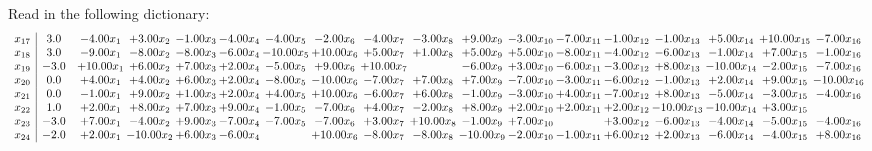\documentclass[9pt]{article}
\begin{document}
Read in the following dictionary:
\[\begin{array}{c| c c@{\hskip 2pt} c@{\hskip 2pt} c@{\hskip 2pt} c@{\hskip 2pt} c@{\hskip 2pt} c@{\hskip 2pt} c@{\hskip 2pt} c@{\hskip 2pt} c@{\hskip 2pt} c@{\hskip 2pt} c@{\hskip 2pt} c@{\hskip 2pt} c@{\hskip 2pt} c@{\hskip 2pt} c@{\hskip 2pt} c@{\hskip 2pt} }
 x_{17}   &  3.0 & -4.00 x_{1} & +  3.00 x_{2} & -1.00 x_{3} & -4.00 x_{4} & -4.00 x_{5} & -2.00 x_{6} & -4.00 x_{7} & -3.00 x_{8} & +  9.00 x_{9} & -3.00 x_{10} & -7.00 x_{11} & -1.00 x_{12} & -1.00 x_{13} & +  5.00 x_{14} & + 10.00 x_{15} & -7.00 x_{16}\\
 x_{18}   &  3.0 & -9.00 x_{1} & -8.00 x_{2} & -8.00 x_{3} & -6.00 x_{4} & -10.00 x_{5} & + 10.00 x_{6} & +  5.00 x_{7} & +  1.00 x_{8} & +  5.00 x_{9} & +  5.00 x_{10} & -8.00 x_{11} & -4.00 x_{12} & -6.00 x_{13} & -1.00 x_{14} & +  7.00 x_{15} & -1.00 x_{16}\\
 x_{19}   &  -3.0 & + 10.00 x_{1} & +  6.00 x_{2} & +  7.00 x_{3} & +  2.00 x_{4} & -5.00 x_{5} & +  9.00 x_{6} & + 10.00 x_{7} &   & -6.00 x_{9} & +  3.00 x_{10} & -6.00 x_{11} & -3.00 x_{12} & +  8.00 x_{13} & -10.00 x_{14} & -2.00 x_{15} & -7.00 x_{16}\\
 x_{20}   &  0.0 & +  4.00 x_{1} & +  4.00 x_{2} & +  6.00 x_{3} & +  2.00 x_{4} & -8.00 x_{5} & -10.00 x_{6} & -7.00 x_{7} & +  7.00 x_{8} & +  7.00 x_{9} & -7.00 x_{10} & -3.00 x_{11} & -6.00 x_{12} & -1.00 x_{13} & +  2.00 x_{14} & +  9.00 x_{15} & -10.00 x_{16}\\
 x_{21}   &  0.0 & -1.00 x_{1} & +  9.00 x_{2} & +  1.00 x_{3} & +  2.00 x_{4} & +  4.00 x_{5} & + 10.00 x_{6} & -6.00 x_{7} & +  6.00 x_{8} & -1.00 x_{9} & -3.00 x_{10} & +  4.00 x_{11} & -7.00 x_{12} & +  8.00 x_{13} & -5.00 x_{14} & -3.00 x_{15} & -4.00 x_{16}\\
 x_{22}   &  1.0 & +  2.00 x_{1} & +  8.00 x_{2} & +  7.00 x_{3} & +  9.00 x_{4} & -1.00 x_{5} & -7.00 x_{6} & +  4.00 x_{7} & -2.00 x_{8} & +  8.00 x_{9} & +  2.00 x_{10} & +  2.00 x_{11} & +  2.00 x_{12} & -10.00 x_{13} & -10.00 x_{14} & +  3.00 x_{15} &   \\
 x_{23}   &  -3.0 & +  7.00 x_{1} & -4.00 x_{2} & +  9.00 x_{3} & -7.00 x_{4} & -7.00 x_{5} & -7.00 x_{6} & +  3.00 x_{7} & + 10.00 x_{8} & -1.00 x_{9} & +  7.00 x_{10} &   & +  3.00 x_{12} & -6.00 x_{13} & -4.00 x_{14} & -5.00 x_{15} & -4.00 x_{16}\\
 x_{24}   &  -2.0 & +  2.00 x_{1} & -10.00 x_{2} & +  6.00 x_{3} & -6.00 x_{4} &   & + 10.00 x_{6} & -8.00 x_{7} & -8.00 x_{8} & -10.00 x_{9} & -2.00 x_{10} & -1.00 x_{11} & +  6.00 x_{12} & +  2.00 x_{13} & -6.00 x_{14} & -4.00 x_{15} & +  8.00 x_{16}\\

\end{array}\]
\end{document}
